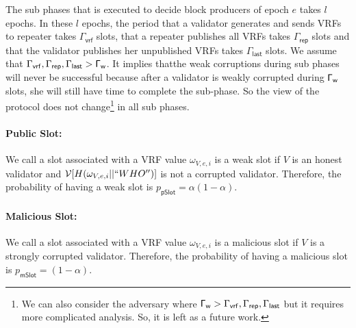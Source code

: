 The sub phases that is executed to decide block producers of epoch $ e $ takes $ l $ epochs.	
In these $ l $ epochs, the period that a validator generates and sends VRFs to repeater takes $ \Gamma_{\mathsf{vrf}} $ slots, that a repeater publishes all VRFs takes $ \Gamma_{\mathsf{rep}} $ slots and that the validator publishes her unpublished VRFs takes $ \Gamma_{\mathsf{last}} $ slots. We assume that $ \Gamma_{\mathsf{vrf}}, \Gamma_{\mathsf{rep}}, \Gamma_{\mathsf{last}}> \mathsf{\Gamma_{w}} $. It implies thatthe weak corruptions during sub phases will never be successful because after a validator is weakly corrupted during $\mathsf{\Gamma_{w}} $ slots, she will still have time to complete the sub-phase. So the view of the protocol does not change\footnote{We can also consider the adversary where $ \mathsf{\Gamma_{w}} > \Gamma_{\mathsf{vrf}}, \Gamma_{\mathsf{rep}}, \Gamma_{\mathsf{last}} $ but it requires more complicated analysis. So, it is left as a future work.} in all sub phases. 







\paragraph{Public Slot:} We call a slot associated with a VRF value $ \omega_{V,e,i} $ is a weak slot  if $ V $ is an honest validator and $ \mathcal{V}[H(\omega_{V,e,i}||``WHO'')] $ is not a corrupted validator. Therefore, the probability of having a weak slot is $ p_{\mathsf{pSlot}} = \alpha (1-\alpha) $.  

\paragraph{Malicious Slot:}  We call a slot associated with a VRF value $ \omega_{V,e,i} $ is a malicious slot  if $ V $ is a strongly corrupted validator. Therefore, the probability of having a malicious slot is $ p_{\mathsf{mSlot}} =  (1-\alpha) $.  



